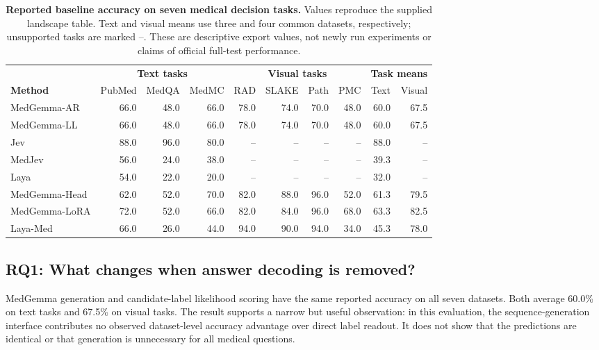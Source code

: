 \begin{table}[t]
\centering\scriptsize\setlength{\tabcolsep}{3.4pt}\renewcommand{\arraystretch}{1.23}
\caption{\textbf{Reported baseline accuracy on seven medical decision tasks.} Values reproduce the supplied landscape table. Text and visual means use three and four common datasets, respectively; unsupported tasks are marked --. These are descriptive export values, not newly run experiments or claims of official full-test performance.}
\label{tab:accuracy}
\begin{tabular*}{\linewidth}{@{\extracolsep{\fill}}lrrrrrrrrr@{}}
\toprule
 & \multicolumn{3}{c}{\textbf{Text tasks}} & \multicolumn{4}{c}{\textbf{Visual tasks}} & \multicolumn{2}{c}{\textbf{Task means}}\\
\cmidrule(lr){2-4}\cmidrule(lr){5-8}\cmidrule(lr){9-10}
\textbf{Method} & PubMed & MedQA & MedMC & RAD & SLAKE & Path & PMC & Text & Visual\\
\midrule
MedGemma-AR & 66.0 & 48.0 & 66.0 & 78.0 & 74.0 & 70.0 & 48.0 & 60.0 & 67.5\\
MedGemma-LL & 66.0 & 48.0 & 66.0 & 78.0 & 74.0 & 70.0 & 48.0 & 60.0 & 67.5\\
Jev & 88.0 & 96.0 & 80.0 & -- & -- & -- & -- & 88.0 & --\\
MedJev & 56.0 & 24.0 & 38.0 & -- & -- & -- & -- & 39.3 & --\\
Laya & 54.0 & 22.0 & 20.0 & -- & -- & -- & -- & 32.0 & --\\
\midrule
\textcolor{PaperPurple}{MedGemma-Head} & 62.0 & 52.0 & 70.0 & 82.0 & 88.0 & 96.0 & 52.0 & 61.3 & 79.5\\
\textcolor{PaperPurple}{MedGemma-LoRA} & 72.0 & 52.0 & 66.0 & 82.0 & 84.0 & 96.0 & 68.0 & 63.3 & 82.5\\
\textcolor{PaperTeal}{Laya-Med} & 66.0 & 26.0 & 44.0 & 94.0 & 90.0 & 94.0 & 34.0 & 45.3 & 78.0\\
\bottomrule
\end{tabular*}
\end{table}


\subsection{RQ1: What changes when answer decoding is removed?}

MedGemma generation and candidate-label likelihood scoring have the same reported accuracy on all seven datasets. Both average 60.0\% on text tasks and 67.5\% on visual tasks. The result supports a narrow but useful observation: in this evaluation, the sequence-generation interface contributes no observed dataset-level accuracy advantage over direct label readout. It does not show that the predictions are identical or that generation is unnecessary for all medical questions.

